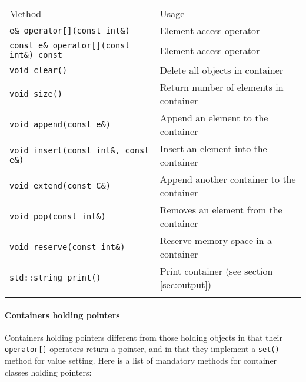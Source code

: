 \documentclass{article}[12pt,a4]
\begin{document}
\begin{center}
\begin{tabular}{ll}
\hline
\hline
\noalign{\smallskip}
Method & Usage \\
\noalign{\smallskip}
\hline
\noalign{\smallskip}
{\tt e\& operator[](const int\&)} & Element access operator \\
{\tt const e\& operator[](const int\&) const} & Element access operator \\
{\tt void clear()} & Delete all objects in container \\
{\tt void size()} & Return number of elements in container \\
{\tt void append(const e\&)} & Append an element to the container \\
{\tt void insert(const int\&, const e\&)} & Insert an element into the container \\
{\tt void extend(const C\&)} & Append another container to the container \\
{\tt void pop(const int\&)} & Removes an element from the container \\
{\tt void reserve(const int\&)} & Reserve memory space in a container \\
{\tt std::string print()} & Print container (see section \ref{sec:output}) \\
\noalign{\smallskip}
\hline
\end{tabular}
\end{center}


\paragraph{Containers holding pointers}

Containers holding pointers different from those holding objects in that their {\tt operator[]}
operators return a pointer, and in that they implement a {\tt set()} method for value setting.
Here is a list of mandatory methods for container classes holding pointers:
\end{document}
